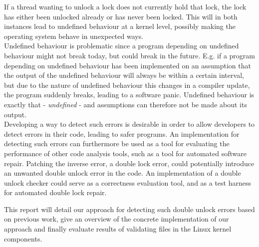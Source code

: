 \noindent If a thread wanting to unlock a lock does not currently hold that lock, the lock has either been unlocked already or has never been locked. This will in both instances lead to undefined behaviour at a kernel level, possibly making the operating system behave in unexpected ways. \\

\noindent Undefined behaviour is problematic since a program depending on undefined behaviour might not break today, but could break in the future. E.g. if a program depending on undefined behaviour has been implemented on an assumption that the output of the undefined behaviour will always be within a certain interval, but due to the nature of undefined behaviour this changes in a compiler update, the program suddenly breaks, leading to a software panic. Undefined behaviour is exactly that - \textit{undefined} - and assumptions can therefore not be made about its output. \\

\noindent Developing a way to detect such errors is desirable in order to allow developers to detect errors in their code, leading to safer programs. An implementation for detecting such errors can furthermore be used as a tool for evaluating the performance of other code analysis tools, such as a tool for automated software repair. Patching the inverse error, a double lock error, could potentially introduce an unwanted double unlock error in the code. An implementation of a double unlock checker could serve as a correctness evaluation tool, and as a test harness for automated double lock repair. \\


\noindent This report will detail our approach for detecting such double unlock errors based on previous work, give an overview of the concrete implementation of our approach and finally evaluate results of validating files in the Linux kernel components.